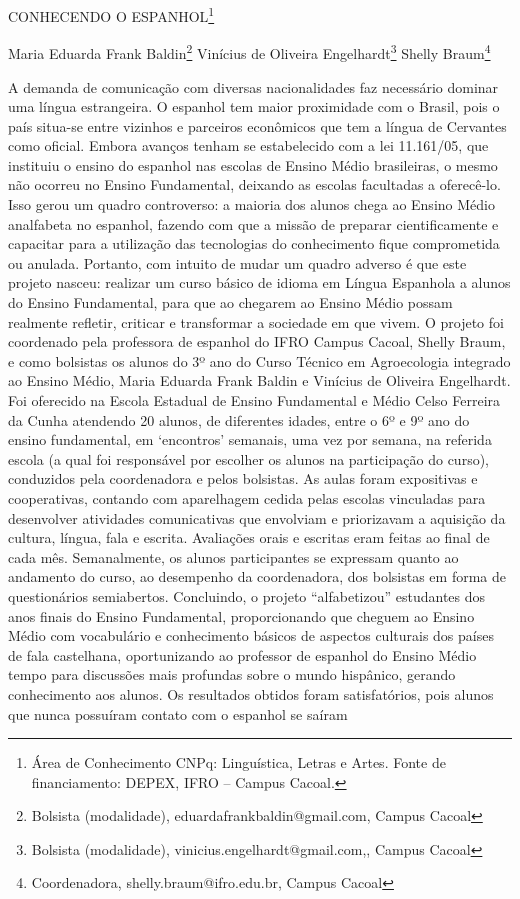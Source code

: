 \documentclass[article,12pt,onesidea,4paper,english,brazil]{abntex2}
\begin{document}
	
	
	\frenchspacing 
	
	\begin{center}
		\LARGE CONHECENDO O ESPANHOL\footnote{Área de Conhecimento CNPq: Linguística, Letras e Artes. Fonte de financiamento: DEPEX, IFRO – Campus Cacoal.}
		
		\normalsize
		Maria Eduarda Frank Baldin\footnote{Bolsista (modalidade), eduardafrankbaldin@gmail.com, Campus Cacoal} 
		Vinícius de Oliveira Engelhardt\footnote{Bolsista (modalidade),  vinicius.engelhardt@gmail.com,, Campus Cacoal} 
		Shelly Braum\footnote{Coordenadora, shelly.braum@ifro.edu.br, Campus Cacoal} 
	\end{center}
	
	\noindent A demanda de comunicação com diversas nacionalidades faz necessário dominar uma língua estrangeira. O espanhol tem maior proximidade com o Brasil, pois o país situa-se entre vizinhos e parceiros econômicos que tem a língua de Cervantes como oficial. Embora avanços tenham se estabelecido com a lei 11.161/05, que instituiu o ensino do espanhol nas escolas de Ensino Médio brasileiras, o mesmo não ocorreu no Ensino Fundamental, deixando as escolas facultadas a oferecê-lo. Isso gerou um quadro controverso: a maioria dos alunos chega ao Ensino Médio analfabeta no espanhol, fazendo com que a missão de preparar cientificamente e capacitar para a utilização das tecnologias do conhecimento fique comprometida ou anulada. Portanto, com intuito de mudar um quadro adverso é que este projeto nasceu: realizar um curso básico de idioma em Língua Espanhola a alunos do Ensino Fundamental, para que ao chegarem ao Ensino Médio possam realmente refletir, criticar e transformar a sociedade em que vivem. O projeto foi coordenado pela professora de espanhol do IFRO Campus Cacoal, Shelly Braum, e como bolsistas os alunos do 3º ano do Curso Técnico em Agroecologia integrado ao Ensino Médio, Maria Eduarda Frank Baldin e Vinícius de Oliveira Engelhardt. Foi oferecido na Escola Estadual de Ensino Fundamental e Médio Celso Ferreira da Cunha atendendo 20 alunos, de diferentes idades, entre o 6º e 9º ano do ensino fundamental, em ‘encontros’ semanais, uma vez por semana, na referida escola (a qual foi responsável por escolher os alunos na participação do curso), conduzidos pela coordenadora e pelos bolsistas. As aulas foram expositivas e cooperativas, contando com aparelhagem cedida pelas escolas vinculadas para desenvolver atividades comunicativas que envolviam e priorizavam a aquisição da cultura, língua, fala e escrita. Avaliações orais e escritas eram feitas ao final de cada mês. Semanalmente, os alunos participantes se expressam quanto ao andamento do curso, ao desempenho da coordenadora, dos bolsistas em forma de questionários semiabertos. Concluindo, o projeto “alfabetizou” estudantes dos anos finais do Ensino Fundamental, proporcionando que cheguem ao Ensino Médio com vocabulário e conhecimento básicos de aspectos culturais dos países de fala castelhana, oportunizando ao professor de espanhol do Ensino Médio tempo para discussões mais profundas sobre o mundo hispânico, gerando conhecimento aos alunos. Os resultados obtidos foram satisfatórios, pois alunos que nunca possuíram contato com o espanhol se saíram 
\end{document}
